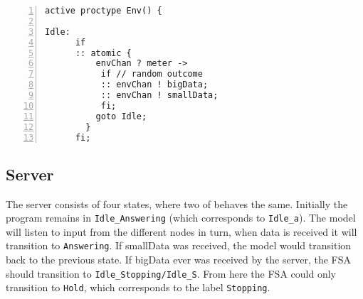 
\begin{lstlisting}[caption=Environment code,language=Promela, numbers=left, basicstyle=\footnotesize, tabsize=2]
active proctype Env() {

Idle:  
      if
      :: atomic { 
          envChan ? meter ->  
           if // random outcome 
           :: envChan ! bigData;
           :: envChan ! smallData;
           fi; 
          goto Idle;
        }
      fi;
\end{lstlisting}


\subsection{Server} \label{serversection}

The server consists of four states, where two of behaves the same. Initially the program remains in \texttt{Idle\_Answering} (which corresponds to \texttt{Idle\_a}). The model will listen to input from the different nodes in turn, when data is received it will transition to \texttt{Answering}. If smallData was received, the model would transition back to the previous state. If bigData ever was received by the server, the FSA should transition to \texttt{Idle\_Stopping/Idle\_S}. From here the FSA could only transition to \texttt{Hold}, which corresponds to the label \texttt{Stopping}. 



